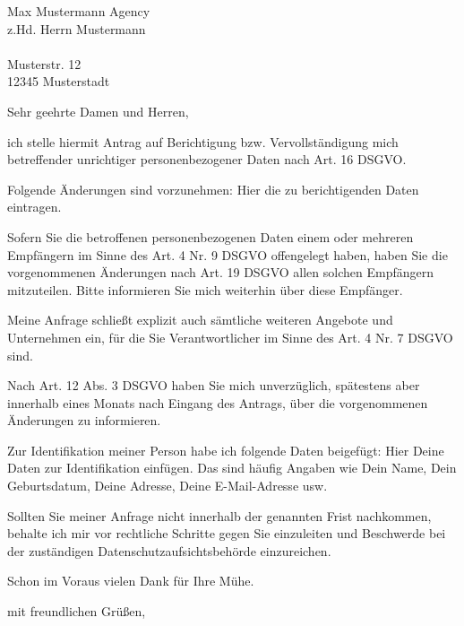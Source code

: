 \documentclass[a4paper, pagenumber=footmiddle, parskip=half,
	foldmarks=true,foldmarks=BmT,
	fromalign=right,  %
	fromphone=false, fromfax=false, fromemail=true, fromurl=true, fromlogo=true,
	fromrule=false, version=last]{scrlttr2}
\begin{document}
\begin{letter}{
	Max Mustermann Agency\\ 
	z.Hd. Herrn Mustermann\\ \ \\
	Musterstr. 12\\
	12345 Musterstadt
}
\flushleft
\opening{Sehr geehrte Damen und Herren,}

ich stelle hiermit Antrag auf Berichtigung bzw. Vervollständigung mich betreffender unrichtiger personenbezogener Daten nach Art. 16 DSGVO.

Folgende Änderungen sind vorzunehmen:
Hier die zu berichtigenden Daten eintragen.

Sofern Sie die betroffenen personenbezogenen Daten einem oder mehreren Empfängern im Sinne des Art. 4 Nr. 9 DSGVO offengelegt haben, haben Sie die vorgenommenen Änderungen nach Art. 19 DSGVO allen solchen Empfängern mitzuteilen. Bitte informieren Sie mich weiterhin über diese Empfänger.

Meine Anfrage schließt explizit auch sämtliche weiteren Angebote und Unternehmen ein, für die Sie Verantwortlicher im Sinne des Art. 4 Nr. 7 DSGVO sind.

Nach Art. 12 Abs. 3 DSGVO haben Sie mich unverzüglich, spätestens aber innerhalb eines Monats nach Eingang des Antrags, über die vorgenommenen Änderungen zu informieren.

Zur Identifikation meiner Person habe ich folgende Daten beigefügt:
Hier Deine Daten zur Identifikation einfügen. Das sind häufig Angaben wie Dein Name, Dein Geburtsdatum, Deine Adresse, Deine E-Mail-Adresse usw.

Sollten Sie meiner Anfrage nicht innerhalb der genannten Frist nachkommen, behalte ich mir vor rechtliche Schritte gegen Sie einzuleiten und Beschwerde bei der zuständigen Datenschutzaufsichtsbehörde einzureichen.

Schon im Voraus vielen Dank für Ihre Mühe.


\closing{mit freundlichen Grüßen,}


\end{letter}
\end{document}
